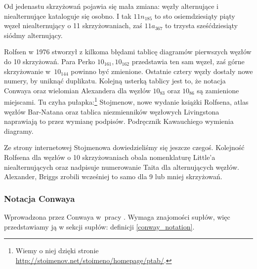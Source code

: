 Od jedenastu skrzyżowań pojawia się mała zmiana: węzły alternujące i niealternujące kataloguje się osobno.
I tak $11n_{185}$ to sto osiemdziesiąty piąty węzeł niealternujący o 11 skrzyżowaniach, zaś $11a_{367}$ to trzysta sześćdziesiąty siódmy alternujący.

Rolfsen w 1976 stworzył z kilkoma błędami tablicę diagramów pierwszych węzłów do 10 skrzyżowań.
Para Perko $10_{161}, 10_{162}$ przedstawia ten sam węzeł, zaś górne skrzyżowanie w~$10_{144}$ powinno być zmienione.
Ostatnie cztery węzły dostały nowe numery, by uniknąć duplikatu.
Kolejną usterką tablicy jest to, że notacja Conwaya oraz wielomian Alexandera dla węzłów $10_{83}$ oraz $10_{86}$ są zamienione miejscami.
Tu czyha pułapka:\footnote{Wiemy o niej dzięki stronie \url{http://stoimenov.net/stoimeno/homepage/ptab/}.} Stojmenow, nowe wydanie książki Rolfsena, atlas węzłów Bar-Natana oraz tablica niezmienników węzłowych Livingstona naprawiają to przez wymianę podpisów.
Podręcznik Kawauchiego wymienia diagramy.

Ze strony internetowej Stojmenowa dowiedzieliśmy się jeszcze czegoś.
Kolejność Rolfsena dla węzłów o 10 skrzyżowaniach obala nomenklaturę Little'a niealternujących oraz nadpisuje numerowanie Taita dla alternujących węzłów.
Alexander, Briggs zrobili wcześniej to samo dla 9 lub mniej skrzyżowań.

%

\subsubsection{Notacja Conwaya}
%
Wprowadzona przez Conwaya w~pracy \cite{conway1970}.
Wymaga znajomości supłów, więc przedstawiamy ją w sekcji supłów: definicji \ref{conway_notation}.

